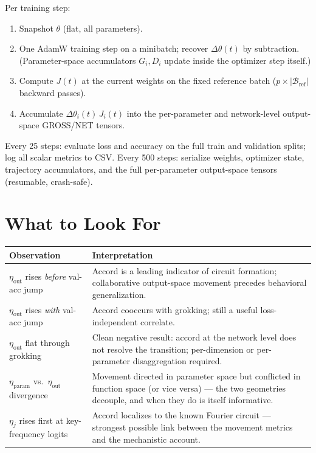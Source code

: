 \documentclass[11pt]{article}
\begin{document}
Per training step:
\begin{enumerate}
    \item Snapshot $\theta$ (flat, all parameters).
    \item One AdamW training step on a minibatch; recover $\Delta\theta(t)$ by subtraction.
          (Parameter-space accumulators $G_i, D_i$ update inside the optimizer step itself.)
    \item Compute $J(t)$ at the current weights on the fixed reference batch
          ($p \times |\mathcal{B}_{\mathrm{ref}}|$ backward passes).
    \item Accumulate $\Delta\theta_i(t)\,J_i(t)$ into the per-parameter and network-level
          output-space GROSS/NET tensors.
\end{enumerate}
Every 25 steps: evaluate loss and accuracy on the full train and validation splits; log all
scalar metrics to CSV. Every 500 steps: serialize weights, optimizer state, trajectory
accumulators, and the full per-parameter output-space tensors (resumable, crash-safe).

\section{What to Look For}

\begin{center}
\renewcommand{\arraystretch}{1.4}
\begin{tabular}{lp{8.5cm}}
\toprule
\textbf{Observation} & \textbf{Interpretation} \\
\midrule
$\eta_{\mathrm{out}}$ rises \emph{before} val-acc jump &
    Accord is a leading indicator of circuit formation; collaborative output-space movement
    precedes behavioral generalization. \\
$\eta_{\mathrm{out}}$ rises \emph{with} val-acc jump &
    Accord cooccurs with grokking; still a useful loss-independent correlate. \\
$\eta_{\mathrm{out}}$ flat through grokking &
    Clean negative result: accord at the network level does not resolve the transition;
    per-dimension or per-parameter disaggregation required. \\
$\eta_{\mathrm{param}}$ vs.\ $\eta_{\mathrm{out}}$ divergence &
    Movement directed in parameter space but conflicted in function space (or vice versa) ---
    the two geometries decouple, and when they do is itself informative. \\
$\eta_j$ rises first at key-frequency logits &
    Accord localizes to the known Fourier circuit --- strongest possible link between the
    movement metrics and the mechanistic account. \\
\bottomrule
\end{tabular}
\end{center}
\end{document}
